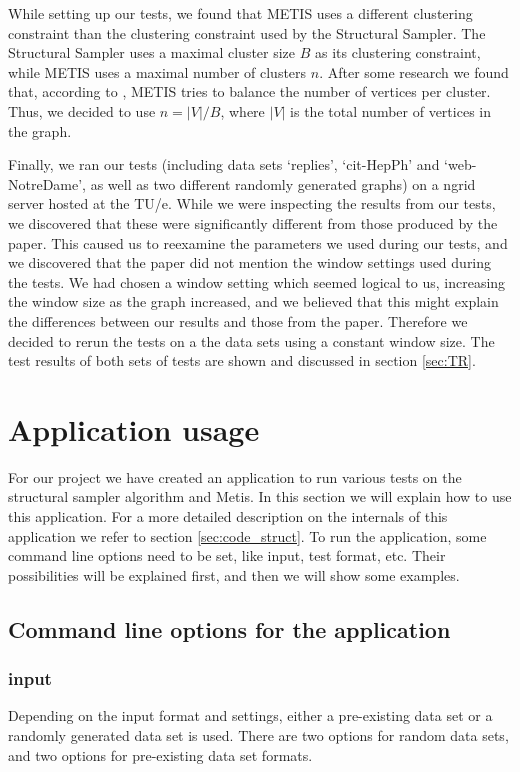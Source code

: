 \documentclass[a4paper]{article}
\begin{document}
While setting up our tests, we found that METIS uses a different clustering constraint than the clustering constraint used by the Structural Sampler. The Structural Sampler uses a maximal cluster size $B$ as its clustering constraint, while METIS uses a maximal number of clusters $n$. After some research we found that, according to \cite{METIS}, METIS tries to balance the number of vertices per cluster. Thus, we decided to use $n=|V|/B$, where $|V|$ is the total number of vertices in the graph. %

Finally, we ran our tests (including data sets `replies', `cit-HepPh' and `web-NotreDame', as well as two different randomly generated graphs) on a ngrid server hosted at the TU/e. While we were inspecting the results from our tests, we discovered that these were significantly different from those produced by the paper. This caused us to reexamine the parameters we used during our tests, and we discovered that the paper did not mention the window settings used during the tests. We had chosen a window setting which seemed logical to us, increasing the window size as the graph increased, and we believed that this might explain the differences between our results and those from the paper. Therefore we decided to rerun the tests on a the data sets using a constant window size. The test results of both sets of tests are shown and discussed in section \ref{sec:TR}. 

\section{Application usage}\label{sec:Code}
For our project we have created an application to run various tests on the structural sampler algorithm and Metis. In this section we will explain how to use this application. For a more detailed description on the internals of this application we refer to section \ref{sec:code_struct}. To run the application, some command line options need to be set, like input, test format, etc. Their possibilities will be explained first, and then we will show some examples.


\subsection{Command line options for the application}

\subsubsection{input}
Depending on the input format and settings, either a pre-existing data set or a randomly generated data set is used. There are two options for random data sets, and two options for pre-existing data set formats.\\
\end{document}
